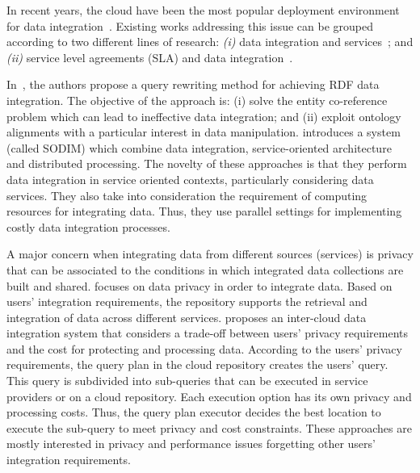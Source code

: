 In recent years, the cloud have been the most popular deployment environment for data integration~\cite{Carvalho2015}. Existing works addressing this issue can be grouped according to two different lines of research:
\textit{(i)} data integration and services~\cite{Correndo2010,ElSheikh2013,Tian2010,YauY08}; and
\textit{(ii)} service level agreements (SLA) and data integration~\cite{Bennani2014,Nie07}. 

In~\cite{Correndo2010}, the authors propose a query rewriting method for achieving RDF data
integration. %
The objective of the approach is: (i) solve the entity co-reference problem which can lead to ineffective data integration; and (ii) exploit ontology alignments with a particular interest in data manipulation. 
\cite{ElSheikh2013} introduces a system (called SODIM) which combine data
integration, service-oriented architecture and distributed processing. %
The novelty of these approaches is that they perform data integration in service oriented contexts, particularly considering data services. They also take into consideration the requirement of computing resources for integrating data. 
Thus, they use parallel settings for implementing costly data integration processes. 

A major concern when integrating data from different sources (services) is privacy that can be associated to the conditions in which integrated data collections are built and shared.
\cite{YauY08} focuses on data privacy in order to integrate data.
Based on users' integration requirements, the repository supports the retrieval and integration of
data across different services. 
\cite{Tian2010} proposes an inter-cloud data integration system that considers a trade-off between users' privacy requirements and the cost for protecting and processing data. According to the users' privacy requirements, the query plan in the cloud repository creates the users' query. This query is subdivided into sub-queries that can
be executed in service providers or on a cloud repository. Each execution option has its own  privacy and processing costs.
Thus, the query plan executor decides the best location to execute the sub-query to meet privacy and cost constraints.
These approaches are mostly interested in privacy and performance issues forgetting other users' integration requirements.

